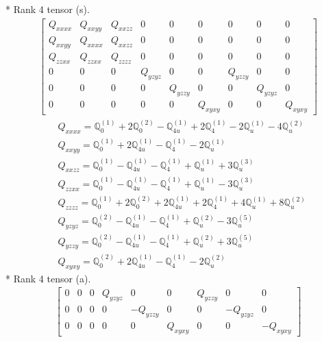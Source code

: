 \documentclass[fleqn,8pt,landscape]{jsarticle}
\begin{document}
* Rank 4 tensor (s).
\begin{align*}
\begin{bmatrix} Q_{xxxx} & Q_{xxyy} & Q_{xxzz} & 0 & 0 & 0 & 0 & 0 & 0 \\ Q_{xxyy} & Q_{xxxx} & Q_{xxzz} & 0 & 0 & 0 & 0 & 0 & 0 \\ Q_{zzxx} & Q_{zzxx} & Q_{zzzz} & 0 & 0 & 0 & 0 & 0 & 0 \\ 0 & 0 & 0 & Q_{yzyz} & 0 & 0 & Q_{yzzy} & 0 & 0 \\ 0 & 0 & 0 & 0 & Q_{yzzy} & 0 & 0 & Q_{yzyz} & 0 \\ 0 & 0 & 0 & 0 & 0 & Q_{xyxy} & 0 & 0 & Q_{xyxy} \end{bmatrix}
\end{align*}
\begin{align*}
& Q_{xxxx} = \mathbb{Q}_{0}^{(1)} + 2 \mathbb{Q}_{0}^{(2)} - \mathbb{Q}_{4u}^{(1)} + 2 \mathbb{Q}_{4}^{(1)} - 2 \mathbb{Q}_{u}^{(1)} - 4 \mathbb{Q}_{u}^{(2)} \\
& Q_{xxyy} = \mathbb{Q}_{0}^{(1)} + 2 \mathbb{Q}_{4u}^{(1)} - \mathbb{Q}_{4}^{(1)} - 2 \mathbb{Q}_{u}^{(1)} \\
& Q_{xxzz} = \mathbb{Q}_{0}^{(1)} - \mathbb{Q}_{4u}^{(1)} - \mathbb{Q}_{4}^{(1)} + \mathbb{Q}_{u}^{(1)} + 3 \mathbb{Q}_{u}^{(3)} \\
& Q_{zzxx} = \mathbb{Q}_{0}^{(1)} - \mathbb{Q}_{4u}^{(1)} - \mathbb{Q}_{4}^{(1)} + \mathbb{Q}_{u}^{(1)} - 3 \mathbb{Q}_{u}^{(3)} \\
& Q_{zzzz} = \mathbb{Q}_{0}^{(1)} + 2 \mathbb{Q}_{0}^{(2)} + 2 \mathbb{Q}_{4u}^{(1)} + 2 \mathbb{Q}_{4}^{(1)} + 4 \mathbb{Q}_{u}^{(1)} + 8 \mathbb{Q}_{u}^{(2)} \\
& Q_{yzyz} = \mathbb{Q}_{0}^{(2)} - \mathbb{Q}_{4u}^{(1)} - \mathbb{Q}_{4}^{(1)} + \mathbb{Q}_{u}^{(2)} - 3 \mathbb{Q}_{u}^{(5)} \\
& Q_{yzzy} = \mathbb{Q}_{0}^{(2)} - \mathbb{Q}_{4u}^{(1)} - \mathbb{Q}_{4}^{(1)} + \mathbb{Q}_{u}^{(2)} + 3 \mathbb{Q}_{u}^{(5)} \\
& Q_{xyxy} = \mathbb{Q}_{0}^{(2)} + 2 \mathbb{Q}_{4u}^{(1)} - \mathbb{Q}_{4}^{(1)} - 2 \mathbb{Q}_{u}^{(2)}
\end{align*}
* Rank 4 tensor (a).
\begin{align*}
\begin{bmatrix} 0 & 0 & 0 & Q_{yzyz} & 0 & 0 & Q_{yzzy} & 0 & 0 \\ 0 & 0 & 0 & 0 & - Q_{yzzy} & 0 & 0 & - Q_{yzyz} & 0 \\ 0 & 0 & 0 & 0 & 0 & Q_{xyxy} & 0 & 0 & - Q_{xyxy} \end{bmatrix}
\end{align*}
\end{document}
